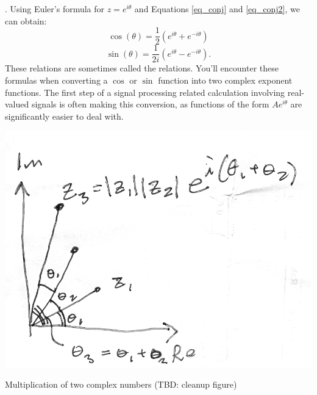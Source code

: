 . Using Euler's formula for $z=e^{i\theta}$ and Equations \ref{eq_conj} and \ref{eq_conj2}, we can obtain:
\begin{equation}
\boxed{
  \cos(\theta)  = \frac{1}{2}\left(e^{i\theta} + e^{-i\theta}\right) \label{inveul0}
  }
  \end{equation}
\begin{equation}
\boxed{
  \sin(\theta)  = \frac{1}{2i}\left(e^{i\theta} - e^{-i\theta}\right). \label{inveul}
  }
\end{equation}
These relations are sometimes called the \emph{} relations. You'll encounter these formulas when converting a $\cos$ or $\sin$ function into two complex exponent functions. The first step of a signal processing related calculation involving real-valued signals is often making this conversion, as functions of the form $A e^{i\theta}$ are significantly easier to deal with.

\begin{marginfigure}
  \begin{center}
\includegraphics[width=\textwidth]{ch03/figures/compmult.png}
\end{center}
  \caption{Multiplication of two complex numbers (TBD: cleanup figure)}
  \label{fig:comp_mult}
\end{marginfigure}


